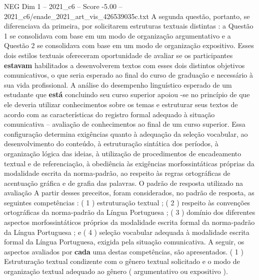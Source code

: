 \begin{textsample}{NEG Dim 1 – 2021\_c6 – Score -5.00 – 2021\_c6/enade\_2021\_art\_vis\_426539035c.txt}
A segunda questão, portanto, se diferenciava da primeira, por solicitarem estruturas textuais distintas : a Questão 1 se consolidava com base em um modo de organização argumentativo e a Questão 2 se consolidava com base em um modo de organização expositivo.
Esses dois estilos textuais ofereceram oportunidade de avaliar se os participantes \textbf{estavam} habilitados a desenvolverem textos com esses dois distintos objetivos comunicativos, o que seria esperado ao final do curso de graduação e necessário à sua vida profissional.
A análise do desempenho linguístico esperado de um estudante que \textbf{está} concluindo seu curso superior apoiou -se no princípio de que ele deveria utilizar conhecimentos sobre os temas e estruturar seus textos de acordo com as características do registro formal adequado à situação comunicativa – avaliação de conhecimentos ao final de um curso superior.
Essa configuração determina exigências quanto à adequação da seleção vocabular, ao desenvolvimento do conteúdo, à estruturação sintática dos períodos, à organização lógica das ideias, à utilização de procedimentos de encadeamento textual e de referenciação, à obediência às exigências morfossintáticas próprias da modalidade escrita da norma-padrão, ao respeito às regras ortográficas de acentuação gráfica e de grafia das palavras.
O padrão de resposta utilizado na avaliação A partir desses preceitos, foram considerados, no padrão de resposta, as seguintes competências : ( 1 ) estruturação textual ; ( 2 ) respeito às convenções ortográficas da norma-padrão da Língua Portuguesa ; ( 3 ) domínio dos diferentes aspectos morfossintáticos próprios da modalidade escrita formal da norma-padrão da Língua Portuguesa ; e ( 4 ) seleção vocabular adequada à modalidade escrita formal da Língua Portuguesa, exigida pela situação comunicativa.
A seguir, os aspectos avaliados por \textbf{cada} uma destas competências, são apresentados. ( 1 ) Estruturação textual condizente com o gênero textual solicitado e o modo de organização textual adequado ao gênero ( argumentativo ou expositivo ).

\end{textsample}

